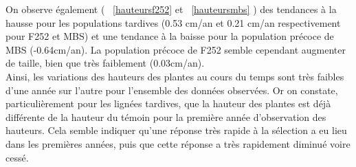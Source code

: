 \documentclass[12pt,a4paper]{article}
\begin{document}
			 				On observe également ( \bsc{Figure}~\ref{hauteursf252} et ~\ref{hauteursmbs} ) des tendances à la hausse pour les populations tardives (0.53 cm/an et 0.21 cm/an respectivement pour F252 et MBS)  et une tendance à la baisse pour la population précoce de MBS (-0.64cm/an). La population précoce de F252 semble cependant augmenter de taille, bien que très faiblement (0.03cm/an).\\		 				
			 				Ainsi, les variations des hauteurs des plantes au cours du temps sont très faibles d'une année sur l'autre pour l'ensemble des données observées. Or on constate, particulièrement pour les lignées tardives, que la hauteur des plantes est déjà différente de la hauteur du témoin pour la première année d'observation des hauteurs. Cela semble indiquer qu'une réponse très rapide à la sélection a eu lieu dans les premières années, puis que cette réponse a très rapidement diminué voire cessé.
			 				
\end{document}
